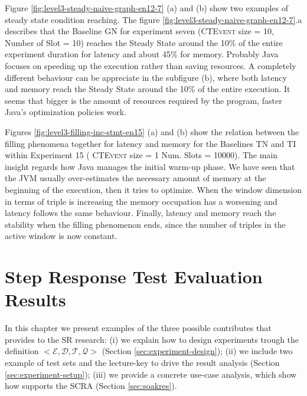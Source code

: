 Figure \ref{fig:level3-steady-naive-graph-en12-7} (a) and (b) show two examples of steady state condition reaching. The figure \ref{fig:level3-steady-naive-graph-en12-7}.a describes that the Baseline GN for experiment seven (\textsc{CTEvent} size = 10, Number of Slot = 10) reaches the Steady State around the 10\% of the entire experiment duration for latency and about 45\% for memory. 
Probably Java focuses on speeding up the execution rather than saving resources. A completely different behaviour can be appreciate in the subfigure (b), where both latency and memory reach the Steady State around the 10\% of the entire execution. It seems that bigger is the amount of resources required by the program, faster Java's optimization policies work.

Figures \ref{fig:level3-filling-inc-stmt-en15} (a) and (b) show the relation between the filling phenomena together for latency and memory for the Baselines TN and TI within Experiment 15 ( \textsc{CTEvent} size = 1 Num. Slots = 10000). The main insight regards how Java manages the initial warm-up phase. We have seen that the JVM usually over-estimates the necessary amount of memory at the beginning of the execution, then it tries to optimize. When the window dimension in terms of triple is increasing the memory occupation has a worsening and latency follows the same behaviour. Finally, latency and memory reach the stability when the filling phenomenon ends, since the number of triples in the active window is now constant.















\pagebreak

\section{Step Response Test Evaluation Results}\label{sec:stressres}

In this chapter we present examples of the three possible contributes that \name provides to the SR research: (i) we explain how to design experiments trough the \name definition $<\mathcal{E},\mathcal{D},\mathcal{T},\mathcal{Q}>$ (Section \ref{sec:experiment-design}); (ii) we include two example of test sets and the lecture-key to drive the result analysis (Section \ref{sec:experiment-setup}); (iii) we provide a concrete use-case analysis, which show how \name supports the SCRA (Section \ref{sec:soakres}).


